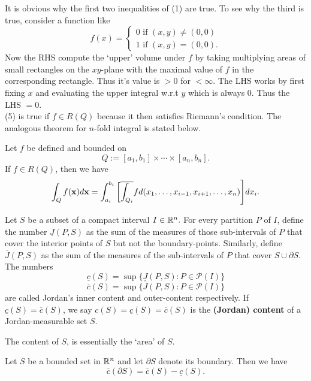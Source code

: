 \documentclass[10pt,a4paper]{book}
\begin{document}
\begin{itemize}
\begin{Thm}
\begin{enumerate}
    \end{enumerate}
    
\end{Thm}


\PP It is obvious why the first two inequalities of (1) are true. To see why the third is true, consider a function like
    $$f(x) = \begin{cases}
    0 \text{ if } (x,y) \neq (0,0)\\
    1 \text{ if } (x,y) = (0,0).
    \end{cases}$$
    Now the RHS compute the `upper' volume under $f$ by taking multiplying areas of small rectangles on the $xy$-plane with the maximal value of $f$ in the corresponding rectangle. Thus it's value is $> 0$ for $< \infty.$ The LHS works by first fixing $x$ and evaluating the upper integral w.r.t $y$ which is always $0$. Thus the LHS $= 0$.\\
    (5) is true if $f \in R(Q)$ because it then satisfies Riemann's condition. The analogous theorem for $n$-fold integral is stated below.
    
    \begin{Thm}
    Let $f$ be defined and bounded on 
    $$Q:=[a_1,b_1]\times \cdots \times [a_n, b_n].$$
    If $f \in R(Q)$, then we have
    $$\int_Q f(\mathbf{x}) d \mathbf{x} = \int_{a_i}^{b_i} \bigg[\overline{\int_{Q_i}} f d (x_1, \dots, x_{i-1},x_{i+1}, \dots, x_n) \Bigg] dx_{i}.$$
    \end{Thm}
\begin{deff}
Let $S$ be a subset of a compact interval $I \in \mathbb{R}^n.$ For every partition $P$ of $I$, define the number $\underline{J}(P,S)$ as the sum of the measures of those sub-intervals of $P$ that cover the interior points of $S$ but not the boundary-points. Similarly, define $\overline{J}(P,S)$ as the sum of the measures of the sub-intervals of $P$ that cover $S\cup \partial S$. The numbers
$$\underline{c}(S) = \sup \{\underline{J}(P,S): P \in \mathcal{P}(I)\}$$
$$\overline{c}(S) = \sup \{\overline{J}(P,S): P \in \mathcal{P}(I)\}$$
are called Jordan's inner content and outer-content respectively. If $\underline{c}(S) = \overline{c}(S)$, we say $c(S) = \underline{c}(S) = \overline{c}(S)$ is the \textbf{(Jordan) content} of a Jordan-measurable set $S$.
\end{deff}
\PP The content of $S$, is essentially the `area' of $S$.
\begin{Thm}
Let $S$ be a bounded set in $\mathbb{R}^n$ and let $\partial S$ denote its boundary. Then we have
$$\overline{c}(\partial S) = \overline{c}(S) - \underline{c}(S).$$
\end{Thm}


\end{itemize}
\end{document}
